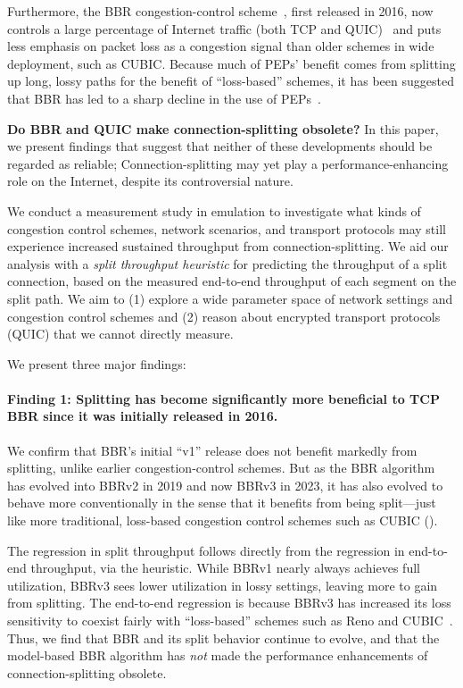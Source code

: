 Furthermore, the BBR congestion-control scheme~\cite{cardwell2017bbr}, first
released in 2016, now controls a large percentage of Internet traffic
(both TCP and QUIC)~\cite{ware2024ccanalyzer} and puts less emphasis on packet
loss as a congestion signal than older schemes in wide
deployment, such as CUBIC. Because much of PEPs' benefit comes from
splitting up long, lossy paths for the benefit of ``loss-based''
schemes, it has been suggested that BBR has led to
a sharp decline in the use of PEPs~\cite{frode}.

\textbf{Do BBR and QUIC make connection-splitting obsolete?} In this
paper, we present findings that suggest that neither of these
developments should be regarded as reliable;
Connection-splitting may yet play a performance-enhancing role
on the Internet, despite its controversial nature.

We conduct a measurement study in emulation to investigate what kinds of
congestion control schemes, network scenarios, and transport protocols may
still experience increased sustained throughput from connection-splitting. We
aid our analysis with a \textit{split throughput heuristic} for predicting the
throughput of a split
connection, based on the measured end-to-end throughput of each segment on the
split path. We aim to (1) explore a wide parameter space of network settings
and congestion control schemes and (2) reason about encrypted transport
protocols (QUIC) that we cannot directly measure.

We present three major findings:

\paragraph{Finding 1: Splitting has become significantly more beneficial to TCP
 BBR since it was initially released in 2016.}

We confirm that BBR's initial ``v1'' release does not benefit markedly from splitting, unlike earlier
congestion-control schemes. But as the BBR algorithm
has evolved into BBRv2 in 2019 and now BBRv3 in 2023, it has also evolved to
behave more conventionally in the sense that it benefits from being
split---just like more traditional, loss-based congestion control schemes such
as CUBIC ().

The regression in split throughput follows directly from the regression
in end-to-end throughput, via the heuristic. While BBRv1 nearly always achieves
full utilization, BBRv3 sees lower utilization in lossy
settings, leaving more to gain from splitting.
The end-to-end regression is because BBRv3 has increased its loss sensitivity
to coexist fairly with ``loss-based'' schemes such as Reno and
CUBIC~\cite{cardwell2024bbrv3-ietf119,ware2019modeling,zeynali2024promises}.
Thus, we find that BBR and its split behavior continue
to evolve, and that the model-based BBR algorithm has \textit{not} made the
performance enhancements of connection-splitting obsolete.

